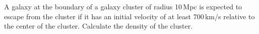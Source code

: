 A galaxy at the boundary of a galaxy cluster of radius 10\,Mpc is expected to
escape from the cluster if it has an initial velocity of at least 700\,km/s
relative to the center of the cluster. Calculate the density of the cluster.
